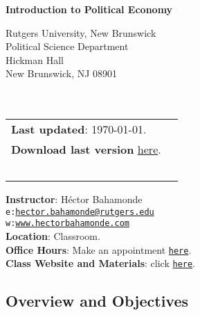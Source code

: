 \documentclass[letterpaper]{article}
\def\name{Introduction to Political Economy}
\begin{document}

\centerline{\huge \bf \name}

\vspace{0.25in}

\begin{minipage}{0.45\linewidth}
  Rutgers University, New Brunswick \\
  Political Science Department \\
  Hickman Hall \\
  New Brunswick, NJ 08901\\
  \\
  \\

\end{minipage}
\hspace{4cm}\begin{minipage}{0.45\linewidth}
  \begin{tabular}{ll}
{\bf Last updated}: \today. \\
 {\bf Download last version} \href{https://github.com/hbahamonde/Political-Economy-Intro-UGrad/raw/master/Pol_Econ_Dev_Syllabus_UGRAD.pdf}{here}.
    \\
    \\
    \\
    \\
    \\
    \\
  \end{tabular}
\end{minipage}

\vspace{-5mm}
{\bf Instructor}: H\'ector Bahamonde\\
\texttt{e:}\href{mailto:hector.bahamonde@rutgers.edu}{\texttt{hector.bahamonde@rutgers.edu}}\\
\texttt{w:}\href{http://www.hectorbahamonde.com}{\texttt{www.hectorbahamonde.com}}\\
{\bf Location}: Classroom.\\
{\bf Office Hours}: Make an appointment \href{https://calendly.com/bahamonde/officehours}{\texttt{here}}.\\
{\bf Class Website and Materials}: click \href{https://github.com/hbahamonde/Political-Economy-Intro-UGrad}{\texttt{here}}.

\subsection*{Overview and Objectives}
\end{document}
